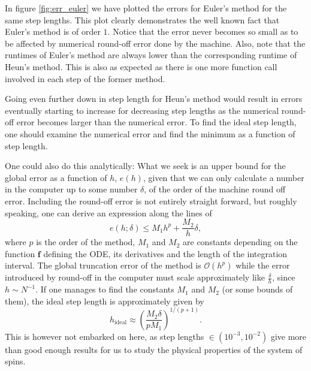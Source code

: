 In figure \ref{fig:err_euler} we have plotted the errors for Euler's method for the same step lengths. This plot clearly demonstrates the well known fact that Euler's method is of order $1$. Notice that the error never becomes so small as to be affected by numerical round-off error done by the machine. Also, note that the runtimes of Euler's method are always lower than the corresponding runtime of Heun's method. This is also as expected as there is one more function call involved in each step of the former method. 

\begin{remark}
	Going even further down in step length for Heun's method would result in errors eventually starting to increase for decreasing step lengths as the numerical round-off error becomes larger than the numerical error. To find the ideal step length, one should examine the numerical error and find the minimum as a function of step length. 
	
	One could also do this analytically: What we seek is an upper bound for the global error as a function of $h$, $e(h)$, given that we can only calculate a number in the computer up to some number $\delta$, of the order of the machine round off error. Including the round-off error is not entirely straight forward, but roughly speaking, one can derive an expression along the lines of 
	$$
		e(h; \delta) \leq M_1 h^p + \frac{M_2}{h} \delta, 
	$$ 
	where $p$ is the order of the method, $M_1$ and $M_2$ are constants depending on the function $\mathbf{f}$ defining the ODE, its derivatives and the length of the integration interval. The global truncation error of the method is $\mathcal{O}(h^p)$ while the error introduced by round-off in the computer must scale approximately like $\frac{\delta}{h}$, since $h\sim N^{-1}$. If one manages to find the constants $M_1$ and $M_2$ (or some bounds of them), the ideal step length is approximately given by 
	$$
		h_{\text{ideal}} \approx \left( \frac{M_2 \delta}{p M_1}  \right)^{1/(p+1)}.
	$$
	This is however not embarked on here, as step lengths $\in (10^{-3},10^{-2})$ give more than good enough results for us to study the physical properties of the system of spins.
\end{remark}
 
